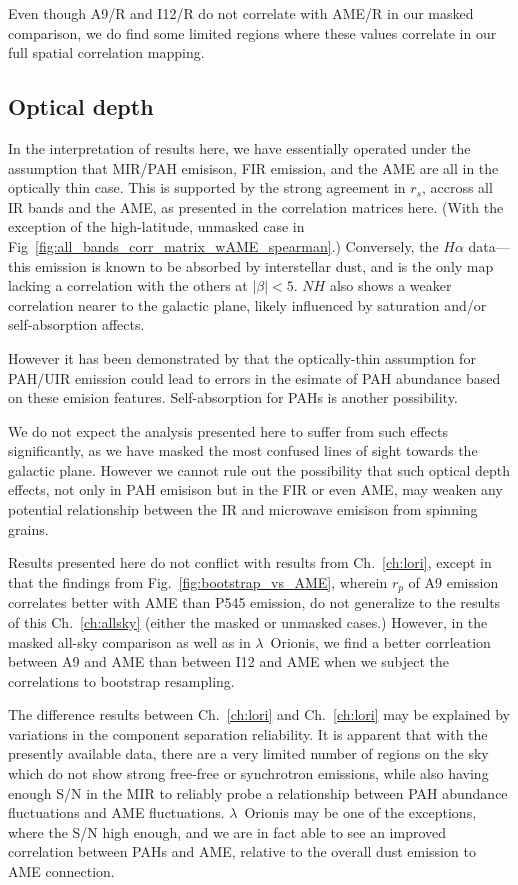              Even though A9/R and I12/R do not correlate with AME/R in our masked comparison, we do find some limited regions where these values correlate in our full spatial correlation mapping.


            \subsection{Optical depth}
              In the interpretation of results here, we have essentially operated under the assumption that MIR/PAH emisison, FIR emission, and the AME are all in the optically thin case. This is supported by the strong agreement in $r_{s}$, accross all IR bands and the AME, as presented in the correlation matrices here. (With the exception of the high-latitude, unmasked case in Fig~\ref{fig:all_bands_corr_matrix_wAME_spearman}.) Conversely, the $H{\alpha}$ data--- this emission is known to be absorbed by interstellar dust, and is the only map lacking a correlation with the others at $|\beta{}|<5$. $N{H}$ also shows a weaker correlation nearer to the galactic plane, likely influenced by saturation and/or self-absorption affects.

              However it has been demonstrated by \cite{sakon04} that the optically-thin assumption for PAH/UIR emission could lead to errors in the esimate of PAH abundance based on these emision features. Self-absorption for PAHs is another possibility.

              We do not expect the analysis presented here to suffer from such effects significantly, as we have masked the most confused lines of sight towards the galactic plane. However we cannot rule out the possibility that such optical depth effects, not only in PAH emisison but in the FIR or even AME, may weaken any potential relationship between the IR and microwave emisison from spinning grains.

              Results presented here do not conflict with results from Ch.~\ref{ch:lori}, except in that the findings from Fig.~\ref{fig:bootstrap_vs_AME}, wherein $r_{p}$ of A9 emission correlates better with AME than P545 emission, do not generalize to the results of this Ch.~\ref{ch:allsky} (either the masked or unmasked cases.) However, in the masked all-sky comparison as well as in $\lambda$~Orionis, we find a better corrleation between A9 and AME than between I12 and AME when we subject the correlations to bootstrap resampling.

               The difference results between Ch.~\ref{ch:lori} and Ch.~\ref{ch:lori} may be explained by variations in the component separation reliability. It is apparent that with the presently available data, there are a very limited number of regions on the sky which do not show strong free-free or synchrotron emissions, while also having enough S/N in the MIR to reliably probe a relationship between PAH abundance fluctuations and AME fluctuations. $\lambda$~Orionis may be one of the exceptions, where the S/N high enough, and we are in fact able to see an improved correlation between PAHs and AME, relative to the overall dust emission to AME connection.

